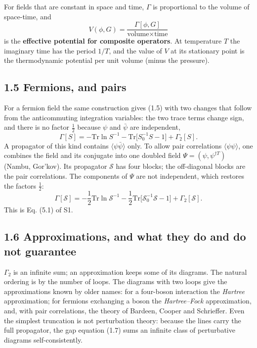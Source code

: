 \documentclass[
  10pt,
]{article}
\begin{document}
For fields that are constant in space and time, \(\Gamma\) is
proportional to the volume of space-time, and
\[V(\phi,G)=\frac{\Gamma[\phi,G]}{\text{volume}\times\text{time}}\tag{1.8}\]
is the \textbf{effective potential for composite operators}. At
temperature \(T\) the imaginary time has the period \(1/T\), and the
value of \(V\) at its stationary point is the thermodynamic potential
per unit volume (minus the pressure).

\hypertarget{fermions-and-pairs}{%
\subsection{1.5 Fermions, and pairs}\label{fermions-and-pairs}}

For a fermion field the same construction gives (1.5) with two changes
that follow from the anticommuting integration variables: the two trace
terms change sign, and there is no factor \(\tfrac12\) because \(\psi\)
and \(\bar\psi\) are independent,
\[\Gamma[S]=-\mathrm{Tr}\ln S^{-1}-\mathrm{Tr}\big[S_0^{-1}S-1\big]+\Gamma_2[S].\tag{1.9}\]
A propagator of this kind contains \(\langle\psi\bar\psi\rangle\) only.
To allow pair correlations \(\langle\psi\psi\rangle\), one combines the
field and its conjugate into one doubled field
\(\Psi=(\psi,\psi^{\dagger T})\) (Nambu, Gor'kov). Its propagator
\(\mathcal S\) has four blocks; the off-diagonal blocks are the pair
correlations. The components of \(\Psi\) are not independent, which
restores the factors \(\tfrac12\):
\[\Gamma[\mathcal S]=-\frac12\mathrm{Tr}\ln\mathcal S^{-1}-\frac12\mathrm{Tr}\big[\mathcal S_0^{-1}\mathcal S-1\big]+\Gamma_2[\mathcal S].\tag{1.10}\]
This is Eq. (5.1) of S1.

\hypertarget{approximations-and-what-they-do-and-do-not-guarantee}{%
\subsection{1.6 Approximations, and what they do and do not
guarantee}\label{approximations-and-what-they-do-and-do-not-guarantee}}

\(\Gamma_2\) is an infinite sum; an approximation keeps some of its
diagrams. The natural ordering is by the number of loops. The diagrams
with two loops give the approximations known by older names: for a
four-boson interaction the \emph{Hartree} approximation; for fermions
exchanging a boson the \emph{Hartree--Fock} approximation, and, with
pair correlations, the theory of Bardeen, Cooper and Schrieffer. Even
the simplest truncation is not perturbation theory: because the lines
carry the full propagator, the gap equation (1.7) sums an infinite class
of perturbative diagrams self-consistently.
\end{document}
